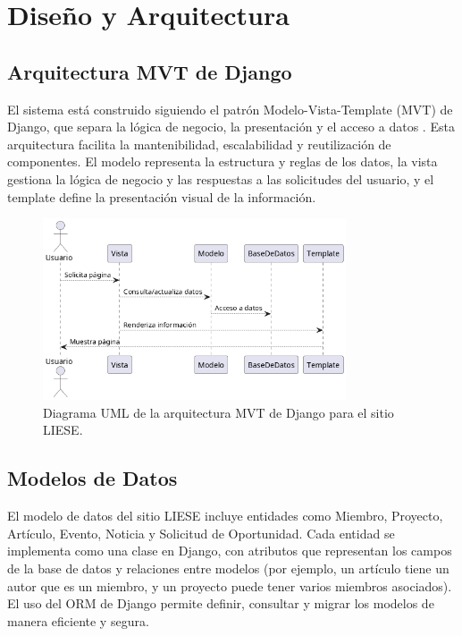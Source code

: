\chapter{Diseño y Arquitectura}
\section{Arquitectura MVT de Django}
El sistema está construido siguiendo el patrón Modelo-Vista-Template (MVT) de Django, que separa la lógica de negocio, la presentación y el acceso a datos \cite{django-docs}. Esta arquitectura facilita la mantenibilidad, escalabilidad y reutilización de componentes. El modelo representa la estructura y reglas de los datos, la vista gestiona la lógica de negocio y las respuestas a las solicitudes del usuario, y el template define la presentación visual de la información.

\begin{figure}[H]
	\centering
	\includegraphics[width=0.8\textwidth]{uml/arquitectura-mvt.png}
	\caption{Diagrama UML de la arquitectura MVT de Django para el sitio LIESE.}
\end{figure}
\newpage
\section{Modelos de Datos}
El modelo de datos del sitio LIESE incluye entidades como Miembro, Proyecto, Artículo, Evento, Noticia y Solicitud de Oportunidad. Cada entidad se implementa como una clase en Django, con atributos que representan los campos de la base de datos y relaciones entre modelos (por ejemplo, un artículo tiene un autor que es un miembro, y un proyecto puede tener varios miembros asociados). El uso del ORM de Django permite definir, consultar y migrar los modelos de manera eficiente y segura.

